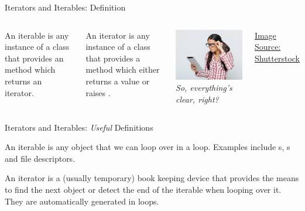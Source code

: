 \begin{frame}[fragile]{Iterators and Iterables: Definition}
%
\begin{columns}
\begin{defbox}[Iterable]
An iterable is any instance of a class that provides an  method which returns an iterator.
\end{defbox}
%
\begin{defbox}[Iterator]
An iterator is any instance of a class that provides a  method which either returns a value or raises .
\end{defbox}
%
\includegraphics[width=\linewidth]{./gfx/03-geek}
\emph{So, everything's clear, right?}

\vspace{6pt}
\begin{flushright}
\tiny
\href{https://www.shutterstock.com/image-photo/beautiful-geek-woman-holding-digital-tablet-421481161}{Image Source: Shutterstock}
\end{flushright}
\end{columns}
%
\end{frame}


\begin{frame}[fragile]{Iterators and Iterables: \emph{Useful} Definitions}
%
\begin{defbox}[Iterable]
An iterable is any object that we can loop over in a  loop. Examples include s, s and file descriptors.
\end{defbox}
%
\begin{defbox}[Iterator]
An iterator is a (usually temporary) book keeping device that provides the means to find the next object or detect the end of the iterable when looping over it.
They are automatically generated in  loops.
\end{defbox}
%
\end{frame}

